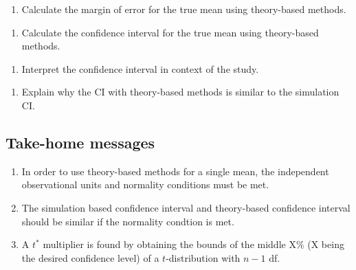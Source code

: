 \documentclass[
]{report}
\providecommand{\tightlist}{%
  \setlength{\itemsep}{0pt}\setlength{\parskip}{0pt}}
\begin{document}
\begin{enumerate}
\def\labelenumi{\arabic{enumi}.}
\setcounter{enumi}{4}
\tightlist
\item
  Calculate the margin of error for the true mean using theory-based methods.
\end{enumerate}

\vspace{0.6in}

\begin{enumerate}
\def\labelenumi{\arabic{enumi}.}
\setcounter{enumi}{5}
\tightlist
\item
  Calculate the confidence interval for the true mean using theory-based methods.
\end{enumerate}

\vspace{0.6in}

\begin{enumerate}
\def\labelenumi{\arabic{enumi}.}
\setcounter{enumi}{6}
\tightlist
\item
  Interpret the confidence interval in context of the study.
\end{enumerate}

\vspace{1in}

\begin{enumerate}
\def\labelenumi{\arabic{enumi}.}
\setcounter{enumi}{7}
\tightlist
\item
  Explain why the CI with theory-based methods is similar to the simulation CI.
\end{enumerate}

\vspace{1in}

\subsection{Take-home messages}\label{take-home-messages-3}

\begin{enumerate}
\def\labelenumi{\arabic{enumi}.}
\item
  In order to use theory-based methods for a single mean, the independent observational units and normality conditions must be met.
\item
  The simulation based confidence interval and theory-based confidence interval should be similar if the normality condtion is met.
\item
  A \(t^*\) multiplier is found by obtaining the bounds of the middle X\% (X being the desired confidence level) of a \(t\)-distribution with \(n - 1\) df.
\end{enumerate}
\end{document}
